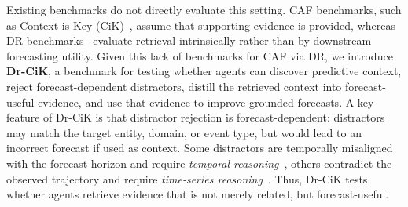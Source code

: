 \documentclass[]{servicenow}
\begin{document}
Existing benchmarks do not directly evaluate this setting. CAF benchmarks, such as Context is Key (CiK)~\citep{williams2024context}, assume that supporting evidence is provided, whereas DR benchmarks~\citep{abaskohi2025drbench,du2025deepresearch} evaluate retrieval intrinsically rather than by downstream forecasting utility. 
Given this lack of benchmarks for CAF via DR, we introduce \textbf{Dr-CiK}, a benchmark for testing whether agents can discover predictive context, reject forecast-dependent distractors, distill the retrieved context into forecast-useful evidence, and use that evidence to improve grounded forecasts.
A key feature of Dr-CiK is that distractor rejection is forecast-dependent: distractors may match the target entity, domain, or event type, but would lead to an incorrect forecast if used as context. Some distractors are temporally misaligned with the forecast horizon and require \emph{temporal reasoning}~\citep{beniwal2024remember}, others contradict the observed trajectory and require \emph{time-series reasoning}~\citep{merrill2024language,chow2024towards,kong2025position,potosnak2024implicit,ye2024beyond}. Thus, Dr-CiK tests whether agents retrieve evidence that is not merely related, but forecast-useful.
\end{document}
